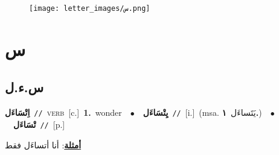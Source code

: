 \documentclass[10pt,a4paper,twoside]{article} %
\begin{document}
\begin{figure*}[t!]\centering\texttt{[image: letter\_images/س.png]}\end{figure*}
\color{white}

 \section*{\foreignlanguage{arabic}{س}} 
 \begin{multicols}{2} 

%
\color{black}
\vspace{-3mm}
\subsection*{\color{blue}\foreignlanguage{arabic}{س.ء.ل}\color{blue}{}} 

{\setlength\topsep{0pt}\textbf{\foreignlanguage{arabic}{اِتْسَاءَل}}\ {\color{gray}\texttt{//}\color{black}}\ \textsc{verb}\ [c.]\ \textbf{1.}~wonder\ \ $\bullet$\ \ \setlength\topsep{0pt}\textbf{\foreignlanguage{arabic}{يِتْسَاءَل}}\ {\color{gray}\texttt{//}\color{black}}\ [i.]\ \color{gray}(msa. \foreignlanguage{arabic}{يَتَساءَل}~\foreignlanguage{arabic}{\textbf{١.}})\color{black}\ \ $\bullet$\ \ \setlength\topsep{0pt}\textbf{\foreignlanguage{arabic}{تْسَاءَل}}\ {\color{gray}\texttt{//}\color{black}}\ [p.]\  \begin{flushright}\color{gray}\foreignlanguage{arabic}{\textbf{\underline{\foreignlanguage{arabic}{أمثلة}}}: أنا أتساءَل فقط}\end{flushright}\color{black}} \vspace{2mm}


\end{multicols}
\end{document}
